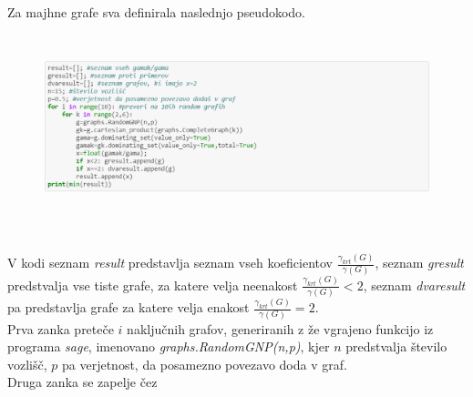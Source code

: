 \documentclass[a4paper]{article}
\begin{document}
Za majhne grafe sva definirala naslednjo pseudokodo.
\begin{figure}[h!]
    \centering
    \includegraphics[width=13cm, height=5.35cm]{Slika1}
    \label{fig:mesh1}
\end{figure}\\
V kodi seznam \textit{result} predstavlja seznam vseh koeficientov $\frac{\gamma_{krt}(G)}{\gamma(G)}$, seznam \textit{gresult} predstvalja vse tiste grafe, za katere velja neenakost $\frac{\gamma_{krt}(G)}{\gamma(G)} < 2$, seznam \textit{dvaresult} pa predstavlja grafe za katere velja enakost $\frac{\gamma_{krt}(G)}{\gamma(G)} = 2$.\\
Prva zanka preteče $i$ naključnih grafov, generiranih z že vgrajeno funkcijo iz programa \textit{sage}, imenovano \textit{graphs.RandomGNP(n,p)}, kjer $n$ predstvalja število vozlišč, $p$ pa verjetnost, da posamezno povezavo doda v graf.\\
Druga zanka se zapelje čez 
\end{document}
